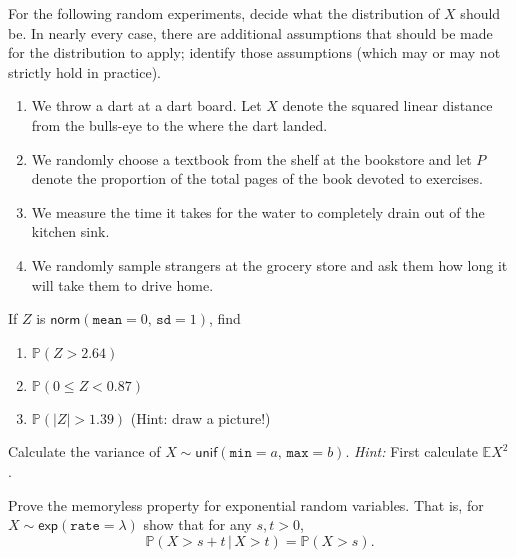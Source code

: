 \begin{xca}
For the following random experiments, decide what the distribution of
\(X\) should be. In nearly every case, there are additional
assumptions that should be made for the distribution to apply;
identify those assumptions (which may or may not strictly hold in
practice).
\begin{enumerate}
\item We throw a dart at a dart board. Let \(X\) denote the squared
linear distance from the bulls-eye to the where the dart landed.
\item We randomly choose a textbook from the shelf at the bookstore and
let \(P\) denote the proportion of the total pages of the book
devoted to exercises.
\item We measure the time it takes for the water to completely drain out
of the kitchen sink.
\item We randomly sample strangers at the grocery store and ask them how
long it will take them to drive home.
\end{enumerate}
\end{xca}

\begin{xca}
If \(Z\) is \(\mathsf{norm}(\mathtt{mean} = 0,\,\mathtt{sd} = 1)\), find 
\begin{enumerate}
\item \(\mathbb{P}(Z > 2.64)\)
\item \(\mathbb{P}(0 \leq Z < 0.87)\)
\item \(\mathbb{P}(|Z| > 1.39)\) (Hint: draw a picture!)
\end{enumerate}
\end{xca}

\begin{xca}
\label{xca-variance-dunif} Calculate the variance of
\(X\sim\mathsf{unif}(\mathtt{min}=a,\,\mathtt{max}=b)\). \emph{Hint:} First
calculate \(\mathbb{E} X^{2}\).
\end{xca}

\begin{xca}
\label{xca-prove-the-memoryless} Prove the memoryless property for
exponential random variables. That is, for \(X \sim
\mathsf{exp}(\mathtt{rate} = \lambda)\) show that for any \(s,t > 0\),
\[ \mathbb{P}(X > s + t\,|\, X > t) = \mathbb{P}(X > s).  \]
\end{xca}
